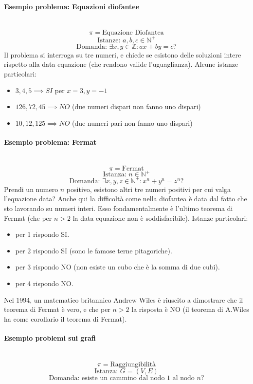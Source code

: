 \documentclass{article}
\begin{document}
\paragraph{Esempio problema: Equazioni diofantee}\mbox{}\\
$$\pi=\text{Equazione Diofantea}$$
$$\text{Istanze: }a,b,c\in\mathbb{N}^+$$
$$\text{Domanda: }\exists x,y\in\mathbb{Z}:ax+by=c?$$
Il problema si interroga su tre numeri, e chiede se esistono delle soluzioni intere rispetto alla data
equazione (che rendono valide l'uguaglianza). Alcune istanze particolari:
\begin{itemize}
    \item $3,4,5 \implies SI$ per $x=3,y=-1$
    \item $126,72,45 \implies NO$ (due numeri dispari non fanno uno dispari)
    \item $10,12,125 \implies NO$ (due numeri pari non fanno uno dispari)
\end{itemize}

\paragraph{Esempio problema: Fermat}\mbox{}\\
$$\pi=\text{Fermat}$$
$$\text{Istanza: }n\in\mathbb{N}^+$$
$$\text{Domanda: }\exists x,y,z\in\mathbb{N}^+:x^n+y^n=z^n?$$
Prendi un numero $n$ positivo, esistono altri tre numeri positivi per cui valga l'equazione data? Anche
qui la difficoltà come nella diofantea è data dal fatto che sto lavorando su numeri interi. Esso
fondamentalmente è l'ultimo teorema di Fermat (che per $n>2$ la data equazione non è soddisfacibile).
Istanze particolari:
\begin{itemize}
    \item per 1 rispondo SI.
    \item per 2 rispondo SI (sono le famose terne pitagoriche).
    \item per 3 rispondo NO (non esiste un cubo che è la somma di due cubi).
    \item per 4 rispondo NO.
\end{itemize}
Nel 1994, un matematico britannico Andrew Wiles è riuscito a dimostrare che il teorema
di Fermat è vero, e che per $n>2$ la risposta è NO (il teorema di A.Wiles
ha come corollario il teorema di Fermat).

\paragraph{Esempio problemi sui grafi}\mbox{}\\
$$\pi=\text{Raggiungibilità}$$
$$\text{Istanza: }G=(V,E)$$
$$\text{Domanda: esiste un cammino dal nodo }1\text{ al nodo }n?$$
\end{document}
